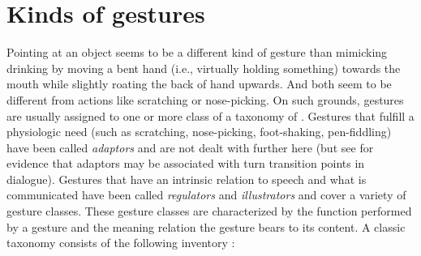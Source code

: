 \documentclass[output=paper]{langsci/langscibook}
\begin{document}
\section{Kinds of gestures}
\label{sec:kinds-gestures}

Pointing at an object seems to be a different kind of gesture than mimicking drinking by moving a bent hand (i.e., virtually holding something) towards the mouth while slightly roating the back of hand upwards.
%
And both seem to be different from actions like scratching or nose-picking.
% 
On such grounds, gestures are usually assigned to one or more class of a taxonomy of .
%
Gestures that fulfill a physiologic need (such as scratching, nose-picking, foot-shaking, pen-fiddling) have been called \emph{adaptors}  \citep{Ekman:Friesen:1969} and are not dealt with further here (but see \citet{Zywiczynski:Wacewicz:Orzechowski:2017} for evidence that adaptors may be associated with turn transition points in dialogue).
%
Gestures that have an intrinsic relation to speech and what is communicated have been called \emph{regulators}  and \emph{illustrators}  \citep{Ekman:Friesen:1969} and cover a variety of gesture classes.
%
These gesture classes are characterized by the function performed by a gesture and the meaning relation the gesture bears to its content.
%
A classic taxonomy consists of the following inventory \citep{McNeill:1992}:
%
\end{document}
